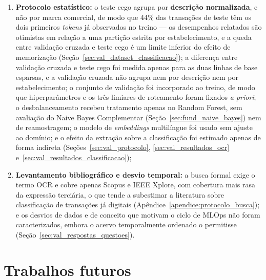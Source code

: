 \begin{enumerate}
	\item \textbf{Protocolo estatístico:} o teste cego agrupa por \textbf{descrição normalizada}, e não por marca comercial, de modo que 44\% das transações de teste têm os dois primeiros \textit{tokens} já observados no treino --- os desempenhos relatados são otimistas em relação a uma partição estrita por estabelecimento, e a queda entre validação cruzada e teste cego é um limite inferior do efeito de memorização (Seção~\ref{sec:val_dataset_classificacao}); a diferença entre validação cruzada e teste cego foi medida apenas para as duas linhas de base esparsas, e a validação cruzada não agrupa nem por descrição nem por estabelecimento; o conjunto de validação foi incorporado ao treino, de modo que hiperparâmetros e os três limiares de roteamento foram fixados \textit{a priori}; o desbalanceamento recebeu tratamento apenas no Random Forest, sem avaliação do Naive Bayes Complementar (Seção~\ref{sec:fund_naive_bayes}) nem de reamostragem; o modelo de \textit{embeddings} multilíngue foi usado sem ajuste ao domínio; e o efeito da extração sobre a classificação foi estimado apenas de forma indireta (Seções~\ref{sec:val_protocolo}, \ref{sec:val_resultados_ocr} e~\ref{sec:val_resultados_classificacao});
	\item \textbf{Levantamento bibliográfico e desvio temporal:} a busca formal exige o termo OCR e cobre apenas Scopus e IEEE Xplore, com cobertura mais rasa da expressão terciária, o que tende a subestimar a literatura sobre classificação de transações já digitais (Apêndice~\ref{apendice:protocolo_busca}); e os desvios de dados e de conceito que motivam o ciclo de MLOps não foram caracterizados, embora o acervo temporalmente ordenado o permitisse (Seção~\ref{sec:val_respostas_questoes}).
\end{enumerate}

\section{Trabalhos futuros}
\label{sec:concl_trabalhos_futuros}

